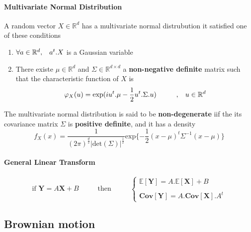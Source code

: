 \documentclass[a4paper,10pt]{article}
\begin{document}
\paragraph{Multivariate Normal Distribution}
A random vector $X\in \mathbb{R}^d$ has a multivariate normal distrubution it satisfied one of these conditions
\begin{enumerate}
	\item $\forall a \in \mathbb{R}^d, \hspace{3mm} a^{t}.X$ is a Gaussian variable
	\item There existe $\mu \in \mathbb{R}^d$ and $\Sigma \in \mathbb{R}^{d\times d}$ a \textbf{non-negative definite} matrix such that the characteristic function of $X$ is
	\[
	\varphi_{X}(u)     =  \text{exp}(i u^{t} .\mu  - \frac{1}{2} u^{t} .\Sigma. u) \hspace{10mm},\hspace{3mm} u\in\mathbb{R}^d
	\]
\end{enumerate}
The multivariate normal distribution is said to be \textbf{non-degenerate} iif the its covariance matrix $\Sigma$ is \textbf{positive definite}, and it has a density 
\[
f_{X}(x) = \frac{1}{ (2\pi)^{\frac{d}{2}} |\text{det}(\Sigma)|^{\frac{1}{2}} } \text{exp}\{ -\frac{1}{2} (x-\mu)^{t} \Sigma^{-1} (x-\mu) \}
\]

\paragraph{General Linear Transform}
\[
\text{if }
\textbf{Y} = A \textbf{X} + B
\hspace{1cm}
\text{ then }
\hspace{1cm}
\left\{
\begin{array}{l}
\mathbb{E}[\textbf{Y}] = A.\mathbb{E}[\textbf{X}] + B  \\ \\
\textbf{Cov}[\textbf{Y}] =  A .\textbf{Cov}[\textbf{X}]. A^t  
\end{array}\right.
\]
\subsection{Brownian motion} 
\end{document}
